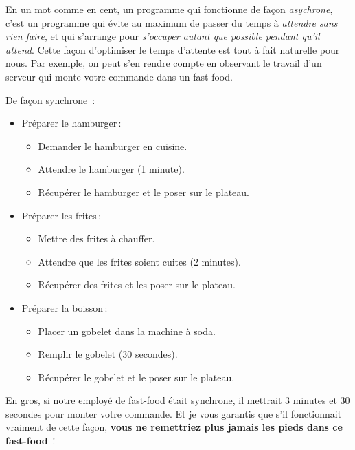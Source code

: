 \documentclass[small]{zmdocument}
\begin{document}

En un mot comme en cent, un programme qui fonctionne de façon \textit{asychrone},
c’est un programme qui évite au maximum de passer du temps à \textit{attendre sans
rien faire}, et qui s’arrange pour \textit{s’occuper autant que possible pendant qu’il
attend}. Cette façon d’optimiser le temps d’attente est tout à fait naturelle
pour nous. Par exemple, on peut s’en rendre compte en observant le travail d’un
serveur qui monte votre commande dans un fast-food.



De façon synchrone :



\begin{itemize}
\item\relax Préparer le hamburger :

\begin{itemize}
\item\relax Demander le hamburger en cuisine.
\item\relax Attendre le hamburger (1 minute).
\item\relax Récupérer le hamburger et le poser sur le plateau.
\end{itemize}
\item\relax Préparer les frites :

\begin{itemize}
\item\relax Mettre des frites à chauffer.
\item\relax Attendre que les frites soient cuites (2 minutes).
\item\relax Récupérer des frites et les poser sur le plateau.
\end{itemize}
\item\relax Préparer la boisson :

\begin{itemize}
\item\relax Placer un gobelet dans la machine à soda.
\item\relax Remplir le gobelet (30 secondes).
\item\relax Récupérer le gobelet et le poser sur le plateau.
\end{itemize}
\end{itemize}


En gros, si notre employé de fast-food était synchrone, il mettrait 3 minutes
et 30 secondes pour monter votre commande. Et je vous garantis que s’il fonctionnait vraiment de cette façon, \textbf{vous ne remettriez plus jamais les pieds dans ce fast-food} ! 
\end{document}
